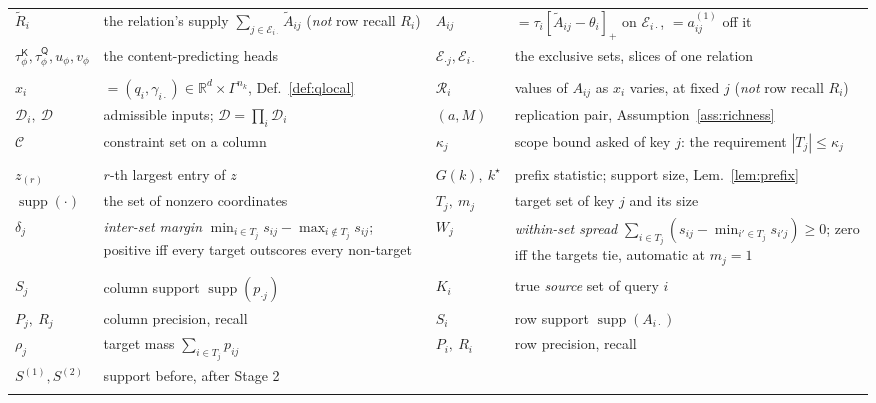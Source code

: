 \documentclass{article}
\newcommand{\supp}{\operatorname{supp}}
\newcommand{\tauK}{\tau^{\mathsf{K}}_\phi}
\newcommand{\tauQ}{\tau^{\mathsf{Q}}_\phi}
\begin{document}
\begin{table}[h]
\begin{tabularx}{\textwidth}{@{}l@{\hspace{0.4em}}Y@{\hspace{0.9em}}l@{\hspace{0.4em}}Y@{}}
$\tilde R_i$ & the relation's supply $\sum_{j\in\mathcal{E}_{i\cdot}}\tilde A_{ij}$ (\emph{not} row recall $R_i$) & $A_{ij}$ & $=\tau_i[\tilde A_{ij}-\theta_i]_+$ on $\mathcal{E}_{i\cdot}$, $=a^{(1)}_{ij}$ off it \\
$\tauK,\tauQ,u_\phi,v_\phi$ & the content-predicting heads & $\mathcal{E}_{\cdot j},\mathcal{E}_{i\cdot}$ & the exclusive sets, slices of one relation \\
\addlinespace
{}\\
$x_i$ & $=(q_i,\gamma_{i\cdot})\in\mathbb{R}^d\times\Gamma^{n_k}$, Def.~\ref{def:qlocal} & $\mathcal{R}_i$ & values of $A_{ij}$ as $x_i$ varies, at fixed $j$ (\emph{not} row recall $R_i$) \\
$\mathcal{D}_i,\ \mathcal{D}$ & admissible inputs; $\mathcal{D}=\prod_i\mathcal{D}_i$ & $(a,M)$ & replication pair, Assumption~\ref{ass:richness} \\
$\mathcal{C}$ & constraint set on a column & $\kappa_j$ & scope bound asked of key $j$: the requirement $|T_j|\le\kappa_j$ \\
\addlinespace
{}\\
$z_{(r)}$ & $r$-th largest entry of $z$ & $G(k),\ k^\star$ & prefix statistic; support size, Lem.~\ref{lem:prefix} \\
$\supp(\cdot)$ & the set of nonzero coordinates & $T_j,\ m_j$ & target set of key $j$ and its size \\
$\delta_j$ & \emph{inter-set margin} $\min_{i\in T_j}s_{ij}-\max_{i\notin T_j}s_{ij}$; positive iff every target outscores every non-target & $W_j$ & \emph{within-set spread} $\sum_{i\in T_j}(s_{ij}-\min_{i'\in T_j}s_{i'j})\ge0$; zero iff the targets tie, automatic at $m_j=1$ \\
\addlinespace
{}\\
$S_j$ & column support $\supp(p_{\cdot j})$ & $K_i$ & true \emph{source} set of query $i$ \\
$P_j,\ R_j$ & column precision, recall & $S_i$ & row support $\supp(A_{i\cdot})$ \\
$\rho_j$ & target mass $\sum_{i\in T_j}p_{ij}$ & $P_i,\ R_i$ & row precision, recall \\
$S^{(1)},S^{(2)}$ & support before, after Stage 2 & & \\
\addlinespace
{}\\

\end{tabularx}
\end{table}
\end{document}
